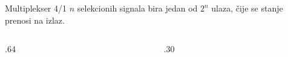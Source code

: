 \begin{frame}[label=03-s013]{Multiplekser 4/1}
\(n\) selekcionih signala bira jedan od \(2^n\) ulaza, čije se stanje prenosi na izlaz.
\begingroup
\def\DEjedinica{.85cm}\def\DEvisina{.68cm}\def\DEdekmod{0}\def\DEcs{0}\def\DEprimer{0}
\begin{columns}[c,onlytextwidth]
\begin{column}{.64\textwidth}\centering

\end{column}
\begin{column}{.30\textwidth}\centering

\end{column}
\end{columns}
\endgroup
\end{frame}
